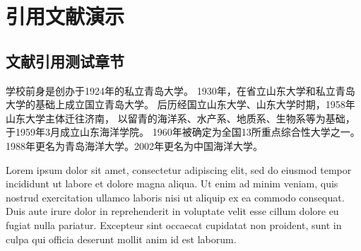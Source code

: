 \chapter{引用文献演示}

\section{文献引用测试章节}

学校前身是创办于1924年的私立青岛大学\cite{knuth86a}。
1930年，在省立山东大学和私立青岛大学的基础上成立国立青岛大学。
后历经国立山东大学、山东大学时期\cite{knuth84}，1958年山东大学主体迁往济南\cite{lamport94}，
以留青的海洋系、水产系、地质系、生物系等为基础，于1959年3月成立山东海洋学院。
1960年被确定为全国13所重点综合性大学之一。1988年更名为青岛海洋大学。2002年更名为中国海洋大学。

Lorem ipsum dolor sit amet\cite{slg}, consectetur adipiscing elit, 
sed do eiusmod tempor incididunt ut labore et dolore magna aliqua\cite{dwx}. 
Ut enim ad minim veniam, 
quis nostrud exercitation ullamco laboris nisi ut aliquip ex ea commodo consequat. 
Duis aute irure dolor in reprehenderit in voluptate velit esse cillum dolore eu fugiat nulla pariatur. 
Excepteur sint occaecat cupidatat non proident, 
sunt in culpa qui officia deserunt mollit anim id est laborum.